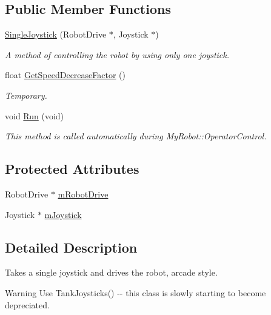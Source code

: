 \subsection*{\-Public \-Member \-Functions}
\begin{DoxyCompactItemize}
\item 
\hyperlink{class_single_joystick_ad52a8b86c9914f11594d67444ca34cef}{\-Single\-Joystick} (\-Robot\-Drive $\ast$, \-Joystick $\ast$)
\begin{DoxyCompactList}\small\item\em \-A method of controlling the robot by using only one joystick. \end{DoxyCompactList}\item 
float \hyperlink{class_single_joystick_ade75309e27c8cee07ffa93067447a6c3}{\-Get\-Speed\-Decrease\-Factor} ()
\begin{DoxyCompactList}\small\item\em \-Temporary. \end{DoxyCompactList}\item 
void \hyperlink{class_single_joystick_a2b07f288539f8be14c1ac58ac115fcbf}{\-Run} (void)
\begin{DoxyCompactList}\small\item\em \-This method is called automatically during \-My\-Robot\-::\-Operator\-Control. \end{DoxyCompactList}\end{DoxyCompactItemize}
\subsection*{\-Protected \-Attributes}
\begin{DoxyCompactItemize}
\item 
\-Robot\-Drive $\ast$ \hyperlink{class_single_joystick_a236ffa6c31b7e2daf0dfc04378561464}{m\-Robot\-Drive}
\item 
\-Joystick $\ast$ \hyperlink{class_single_joystick_a7b8dbf586692ef24b5cc76c290fb9486}{m\-Joystick}
\end{DoxyCompactItemize}


\subsection{\-Detailed \-Description}
\-Takes a single joystick and drives the robot, arcade style. 

\begin{DoxyWarning}{\-Warning}
\-Use \-Tank\-Joysticks() -\/-\/ this class is slowly starting to become depreciated. 
\end{DoxyWarning}


